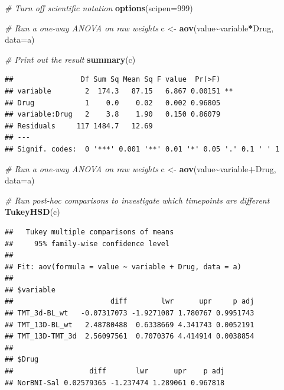 \documentclass[
]{book}
\newenvironment{Shaded}{\begin{snugshade}}{\end{snugshade}}
\newcommand{\AttributeTok}[1]{\textcolor[rgb]{0.13,0.29,0.53}{#1}}
\newcommand{\CommentTok}[1]{\textcolor[rgb]{0.56,0.35,0.01}{\textit{#1}}}
\newcommand{\DecValTok}[1]{\textcolor[rgb]{0.00,0.00,0.81}{#1}}
\newcommand{\FunctionTok}[1]{\textcolor[rgb]{0.13,0.29,0.53}{\textbf{#1}}}
\newcommand{\NormalTok}[1]{#1}
\newcommand{\OtherTok}[1]{\textcolor[rgb]{0.56,0.35,0.01}{#1}}
\newcommand{\SpecialCharTok}[1]{\textcolor[rgb]{0.81,0.36,0.00}{\textbf{#1}}}
\begin{document}
\begin{Shaded}
\begin{Highlighting}[]
\CommentTok{\# Turn off scientific notation}
\FunctionTok{options}\NormalTok{(}\AttributeTok{scipen=}\DecValTok{999}\NormalTok{) }

\CommentTok{\# Run a one{-}way ANOVA on raw weights }
\NormalTok{c }\OtherTok{\textless{}{-}} \FunctionTok{aov}\NormalTok{(value}\SpecialCharTok{\textasciitilde{}}\NormalTok{variable}\SpecialCharTok{*}\NormalTok{Drug, }\AttributeTok{data=}\NormalTok{a)}

\CommentTok{\# Print out the result}
\FunctionTok{summary}\NormalTok{(c)}
\end{Highlighting}
\end{Shaded}

\begin{verbatim}
##                Df Sum Sq Mean Sq F value  Pr(>F)   
## variable        2  174.3   87.15   6.867 0.00151 **
## Drug            1    0.0    0.02   0.002 0.96805   
## variable:Drug   2    3.8    1.90   0.150 0.86079   
## Residuals     117 1484.7   12.69                   
## ---
## Signif. codes:  0 '***' 0.001 '**' 0.01 '*' 0.05 '.' 0.1 ' ' 1
\end{verbatim}

\begin{Shaded}
\begin{Highlighting}[]
\CommentTok{\# Run a one{-}way ANOVA on raw weights }
\NormalTok{c }\OtherTok{\textless{}{-}} \FunctionTok{aov}\NormalTok{(value}\SpecialCharTok{\textasciitilde{}}\NormalTok{variable}\SpecialCharTok{+}\NormalTok{Drug, }\AttributeTok{data=}\NormalTok{a)}

\CommentTok{\# Run post{-}hoc comparisons to investigate which timepoints are different}
\FunctionTok{TukeyHSD}\NormalTok{(c)}
\end{Highlighting}
\end{Shaded}

\begin{verbatim}
##   Tukey multiple comparisons of means
##     95% family-wise confidence level
## 
## Fit: aov(formula = value ~ variable + Drug, data = a)
## 
## $variable
##                       diff        lwr      upr     p adj
## TMT_3d-BL_wt   -0.07317073 -1.9271087 1.780767 0.9951743
## TMT_13D-BL_wt   2.48780488  0.6338669 4.341743 0.0052191
## TMT_13D-TMT_3d  2.56097561  0.7070376 4.414914 0.0038854
## 
## $Drug
##                  diff       lwr      upr    p adj
## NorBNI-Sal 0.02579365 -1.237474 1.289061 0.967818
\end{verbatim}
\end{document}
